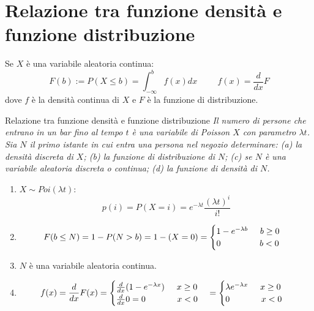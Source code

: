 \section{Relazione tra funzione densità e funzione distribuzione}
Se $X$ è una variabile aleatoria continua:
\begin{equation*}
    F(b):=P(X\leq b)=\int^b_{-\infty}f(x)dx\hspace{1cm}f(x)=\frac{d}{dx}F
\end{equation*}
dove $f$ è la densità continua di $X$ e $F$ è la funzione di distribuzione.

\begin{Example}{Relazione tra funzione densità e funzione distribuzione}{}
    \textit{Il numero di persone che entrano in un bar fino al tempo $t$ è una variabile di Poisson $X$ con parametro $\lambda t$. Sia $N$ il primo istante in cui entra una persona nel negozio determinare: (a) la densità discreta di $X$; (b) la funzione di distribuzione di $N$; (c) se $N$ è una variabile aleatoria discreta o continua; (d) la funzione di densità di $N$.}

    \begin{enumerate}[label=(\alph*)]
        \item  $X\sim Poi(\lambda t)$:
        \begin{equation*}
            p(i)=P(X=i)=e^{-\lambda t}\frac{(\lambda t)^i}{i!}
        \end{equation*}
        \item
        \begin{equation*}
            F(b\leq N)=1-P(N>b)=1-(X=0)=\begin{cases}
                1-e^{-\lambda b}\hspace{0.5cm}b\geq0\\0\hspace{1.6cm}b<0
            \end{cases}
        \end{equation*}
        \item $N$ è una variabile aleatoria continua.
        \item
        \begin{equation*}
            f(x)=\frac{d}{dx}F(x)=\begin{cases}
                \frac{d}{dx}(1-e^{-\lambda x})\hspace{0.5cm}x\geq0\\\frac{d}{dx}0=0\hspace{1.3cm}x<0
            \end{cases}=\begin{cases}
                \lambda e^{-\lambda x}\hspace{0.5cm}x\geq0\\0\hspace{1.3cm}x<0
            \end{cases}
        \end{equation*}
    \end{enumerate}
\end{Example}

